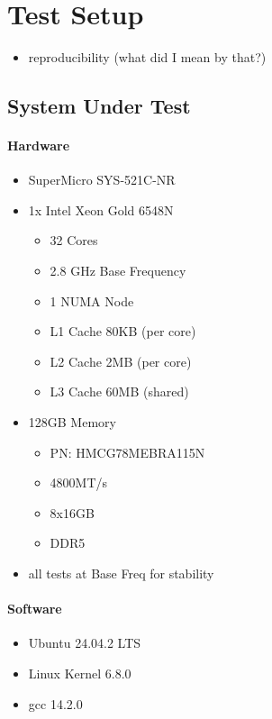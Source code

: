 \section{Test Setup}
\begin{itemize}
    \item reproducibility (what did I mean by that?)
\end{itemize}

\subsection{System Under Test}
\paragraph{Hardware}
\begin{itemize}
    \item SuperMicro SYS-521C-NR
    \item 1x Intel Xeon Gold 6548N
        \begin{itemize}
            \item 32 Cores
            \item 2.8 GHz Base Frequency
            \item 1 NUMA Node
            \item L1 Cache 80KB (per core)
            \item L2 Cache 2MB (per core)
            \item L3 Cache 60MB (shared)
        \end{itemize}
    \item 128GB Memory
        \begin{itemize}
            \item PN: HMCG78MEBRA115N
            \item 4800MT/s
            \item 8x16GB
            \item DDR5
        \end{itemize}
    \item all tests at Base Freq for stability
\end{itemize}

\paragraph{Software}
\begin{itemize}
    \item Ubuntu 24.04.2 LTS
    \item Linux Kernel 6.8.0
    \item gcc 14.2.0
\end{itemize}

